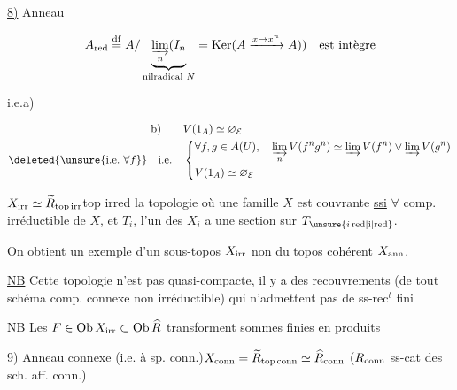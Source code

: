 
\uline{8)} Anneau 

\[
 A_{\rm red}\overset{\rm df}{=}A/\underbrace{\varinjlim_n (I_n}_{\text{nilradical }N}=\operatorname{Ker}(A\xrightarrow{x\mapsto x^n}A))
 \quad\text{est intègre}
\]

i.e.\quad a)

\[
\begin{aligned}
 \mathrm b)\qquad&V(1_A)\simeq\varnothing_{\mathcal E}\\
 \deleted{\unsure{\mathrm{i.e.}\ \forall f}}\quad\text{i.e.}\quad&
 \left\{\begin{aligned}
 &\forall f,g\in A(U),\quad\varinjlim_n V(f^ng^n)\simeq\varinjlim V(f^n)\vee\varinjlim V(g^n)\\
 &V(1_A)\simeq\varnothing_{\mathcal E}
 \end{aligned}\right.
\end{aligned}
\]

$X_{\rm irr}\simeq\widetilde R_{\mathrm{top\,irr}}$\quad top irred la topologie où une famille
$X$ est couvrante \uline{ssi} $\forall$ comp.  irréductible  de $X$,
et   $T_i$, l'un des $X_i$ a une section sur $T_{\unsure{i\,\rm red|i|\rm red}}$.

On obtient un exemple d'un sous-topos $X_{\rm irr}$ non  du topos cohérent $X_{\rm ann}$.

\uline{NB} Cette topologie n'est pas quasi-compacte, il y a des recouvrements
(de  tout schéma  comp. connexe non  irréductible)
qui n'admettent pas de ss-rec$^t$ fini

\uline{NB} Les $F\in\operatorname{Ob}X_{\rm irr}\subset\operatorname{Ob}\widehat R$ transforment sommes finies en produits

\uline{9)} \uline{Anneau connexe} (i.e. à sp. conn.)\quad $X_{\rm conn}=\widetilde R_{\mathrm{top\,conn}}\simeq\widehat R_{\rm conn}$
($R_{\rm conn}$ ss-cat des sch. aff. conn.)

